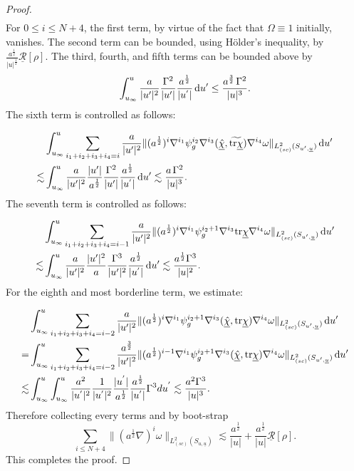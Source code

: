 \documentclass{amsart}
\newcommand{\aln}{(\al \nabla)^i}
\newcommand{\hsp}{\hspace{.5mm}}
\newcommand{\intu}{\int_{u_{\infty}}^u}
\newcommand{\upr}{\lvert u^\prime \rvert}
\newcommand{\al}{a^{\frac{1}{2}}}
\newcommand{\chibar}{\underline{\chi}}
\newcommand{\chibarhat}{\underline{\hat{\chi}}}
\newcommand{\ubar}{\underline{u}}
\newcommand{\tildetr}{\widetilde{\tr \chibar}}
\newcommand{\scaletwoSu}[1]{\lVert{#1} \rVert_{L^2_{(sc)}(S_{u,\ubar})}}
\newcommand{\scaletwoSuprime}[1]{\lVert{#1} \rVert_{L^2_{(sc)}(S_{u^\prime,\ubar})}}
\newcommand{\duprime}{\hspace{.5mm} \text{d}u^{\prime}}
\newcommand{\tr}{\mbox{tr}}
\begin{document}
{\begin{proof}
\begin{align}
    \end{align} For $0\leq i \leq N+4$, the first term, by virtue of the fact that $\Omega\equiv 1$ initially, vanishes. The second term can be bounded, using H\"older's inequality, by $ \frac{\al}{\lvert u \rvert^{\frac{1}{2}}} \underline{\mathcal{R}}[\rho].$ The third, fourth, and fifth terms can be bounded above by
\[\intu \frac{a}{\upr^2}\frac{\Gamma^2}{\upr}\frac{a^{\frac{1}{2}}}{|u^{'}|}\duprime \leq \frac{a^{\frac{3}{2}}\hsp  \Gamma^2}{\lvert u \rvert^3}.\]The sixth term is controlled as follows:

\begin{equation}
    \begin{split}
        &\intu \sum_{i_1+i_2+i_3+i_4=i} \frac{a}{\upr^2}\scaletwoSuprime{(\al)^i \nabla^{i_1}\psi_g^{i_2}\nabla^{i_3}(\chibarhat, \tildetr) \nabla^{i_4}\omega} \duprime \\ \lesssim &\intu \frac{a}{\upr^2} \frac{\upr}{a^{\frac{1}{2}}} \frac{\Gamma^2}{\upr}\frac{a^{\frac{1}{2}}}{|u^{'}|}\duprime
 \lesssim \frac{a \hsp \Gamma^2}{\lvert u \rvert^{3}}.  \end{split}
\end{equation}The seventh term is controlled as follows:

\begin{align}
     \nonumber     &\intu \sum_{i_1+i_2+i_3+i_4=i-1} \frac{a}{\upr^2}\scaletwoSuprime{(\al)^i \nabla^{i_1}\psi_g^{i_2+1}\nabla^{i_3}\tr\chibar \nabla^{i_4}\omega} \duprime \\ \lesssim &\intu \frac{a}{\upr^2} \frac{\upr^2}{a} \frac{\Gamma^3}{\upr^2}\frac{a^{\frac{1}{2}}}{|u^{'}|}\duprime
 \lesssim \frac{a^{\frac{1}{2}}\Gamma^3}{\lvert u \rvert^{2}}.  \end{align} For the eighth and most borderline term, we estimate:

\begin{align}
       \nonumber   &\intu \sum_{i_1+i_2+i_3+i_4=i-2} \frac{a}{\upr^2}\scaletwoSuprime{(\al)^i \nabla^{i_1}\psi_g^{i_2+1}\nabla^{i_3}(\chibarhat,\tr\chibar) \nabla^{i_4}\omega} \duprime \\ \nonumber  =  &\intu \sum_{i_1+i_2+i_3+i_4=i-2} \frac{a^{\frac{3}{2}}}{\upr^2}\scaletwoSuprime{(\al)^{i-1} \nabla^{i_1}\psi_g^{i_2+1}\nabla^{i_3}(\chibarhat,\tr\chibar) \nabla^{i_4}\omega} \duprime \\ \lesssim &\intu \int_{u_{\infty}}^{u}\frac{a^{2}}{|u^{'}|^{2}}\frac{1}{|u^{'}|^{2}}\frac{|u^{'}|}{a^{\frac{1}{2}}}\frac{a^{\frac{1}{2}}}{|u^{'}|}\Gamma^{3}du^{'}\lesssim \frac{a^{2}\Gamma^{3}}{|u|^{3}}.  \end{align}
       Therefore collecting every terms and by boot-strap
       \[ \sum_{i\leq N+4} \scaletwoSu{\aln \omega} \lesssim \frac{a^{\frac{1}{2}}}{\lvert u \rvert}+\frac{a^{\frac{1}{2}}}{\lvert u \rvert} \underline{\mathcal{R}}[\rho]. \]
       This completes the proof.
\end{proof}

}
\end{document}
